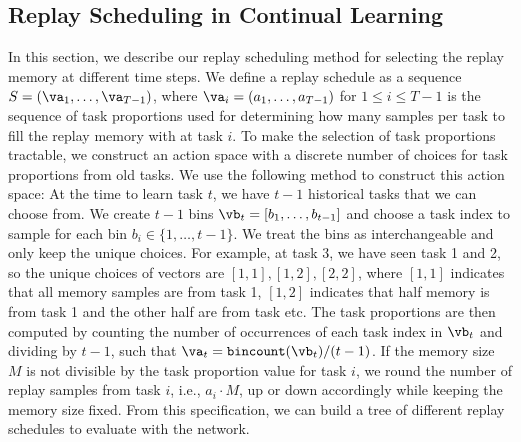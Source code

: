

\subsection{Replay Scheduling in Continual Learning}\label{sec:replay_scheduling_in_continual_learning}

In this section, 
we describe our replay scheduling method for selecting the replay memory at different time steps. We define a replay schedule as a sequence $S = (\va_1, \dots, \va_{T-1})$, where $\va_i = (a_1, \dots, a_{T-1})$ for $1 \leq i \leq T-1$ is the sequence of task proportions used for determining how many samples per task to fill the replay memory with at task $i$. To make the selection of task proportions tractable, we construct an action space with a discrete number of choices for %
task proportions from old tasks. 
We use the following method to construct this action space: At the time to learn task $t$, we have $t-1$ historical tasks that we can choose from. We create $t-1$ bins $\vb_t = [b_1, \dots, b_{t-1}]$ and choose a task index to sample for each bin $b_i \in \{1, \dots, t-1 \}$. We treat the bins as interchangeable and only keep the unique choices. 
For example, at task 3, we have seen task 1 and 2, so the unique choices of vectors are $[1,1], [1,2], [2,2]$, where $[1,1]$ indicates that all memory samples are from task 1, $[1,2]$ indicates that half memory is from task 1 and the other half are from task etc. The task proportions are then computed by counting the number of occurrences of each task index in $\vb_t$ and dividing by $t-1$, such that $\va_t = \texttt{bincount}(\vb_t) / (t-1)$. 
If the memory size $M$ is not divisible by the task proportion value for task $i$, we round the number of replay samples from task $i$, i.e., $a_i \cdot M$, up or down accordingly while keeping the memory size fixed.
From this specification, we can build a tree of different replay schedules to evaluate with the network.


